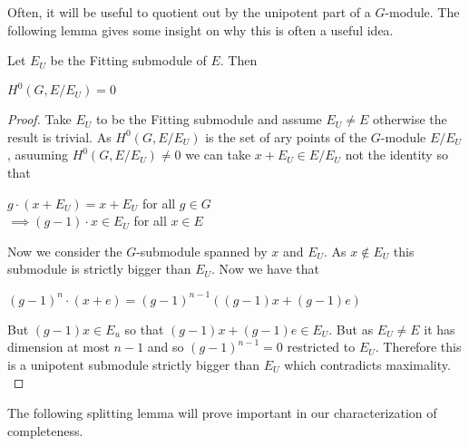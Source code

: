 Often, it will be useful to quotient out by the unipotent part of a $G$-module.
The following lemma gives some insight on why this is often a useful idea.

\begin{lemma}
    Let $E_U$ be the Fitting submodule of $E$. Then
    \begin{center}
        $H^0(G, E/E_U) = 0$
    \end{center}
\end{lemma}

\begin{proof}
    Take $E_U$ to be the Fitting submodule and assume $E_U \neq E$ otherwise the result is trivial.
    As $H^0(G, E/E_U)$ is the set of ary points of the $G$-module $E/E_U$, asuuming $H^0(G, E/E_U)\neq0$
    we can take $x + E_U \in E/E_U$ not the identity so that
    \begin{center}
        $g\cdot (x + E_U) = x+ E_U$ for all $g \in G$ \\
        $ \implies (g - 1)\cdot x \in E_U$ for all $x \in E$
    \end{center}
    Now we consider the $G$-submodule spanned by $x$ and $E_U$. As $x \notin E_U$ this submodule
    is strictly bigger than $E_U$. Now we have that
    \begin{center}
        $(g-1)^n\cdot (x + e) = (g-1)^{n-1}((g-1)x + (g-1)e)$
    \end{center}
    But $(g-1)x \in E_u$ so that $(g-1)x + (g-1)e \in E_U$. But as $E_U \neq E$ it has dimension at most
    $n-1$ and so $(g-1)^{n-1} = 0$ restricted to $E_U$. Therefore this is a unipotent submodule strictly bigger
    than $E_U$ which contradicts maximality. \label{lemma:fitting-submodule}
\end{proof}

The following splitting lemma will prove important in our characterization of
completeness.

